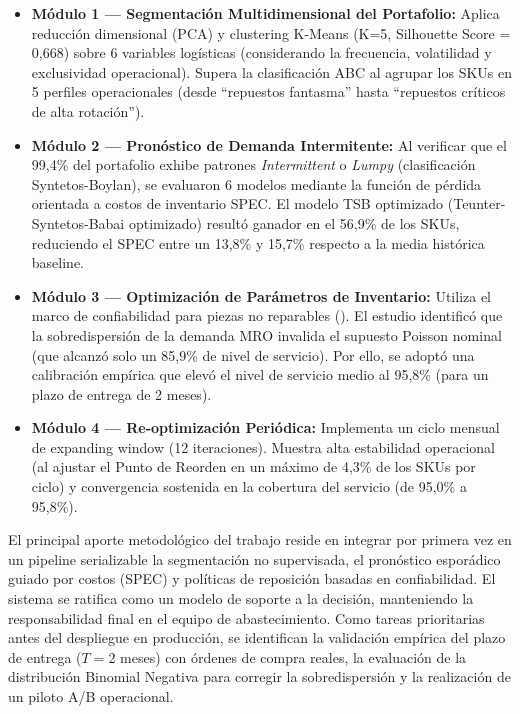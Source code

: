 \documentclass[10pt,a4paper]{article}
\begin{document}
\begin{itemize}
    \item \textbf{Módulo 1 — Segmentación Multidimensional del Portafolio:} Aplica reducción dimensional (PCA) y clustering K-Means (K=5, Silhouette Score = 0,668) sobre 6 variables logísticas (considerando la frecuencia, volatilidad y exclusividad operacional). Supera la clasificación ABC al agrupar los SKUs en 5 perfiles operacionales (desde ``repuestos fantasma'' hasta ``repuestos críticos de alta rotación'').
    
    \item \textbf{Módulo 2 — Pronóstico de Demanda Intermitente:} Al verificar que el 99,4\% del portafolio exhibe patrones \textit{Intermittent} o \textit{Lumpy} (clasificación Syntetos-Boylan), se evaluaron 6 modelos mediante la función de pérdida orientada a costos de inventario SPEC. El modelo TSB optimizado (Teunter-Syntetos-Babai optimizado) resultó ganador en el 56,9\% de los SKUs, reduciendo el SPEC entre un 13,8\% y 15,7\% respecto a la media histórica baseline. 
    
    \item \textbf{Módulo 3 — Optimización de Parámetros de Inventario:} Utiliza el marco de confiabilidad para piezas no reparables (\cite{louit2011}). El estudio identificó que la sobredispersión de la demanda MRO invalida el supuesto Poisson nominal (que alcanzó solo un 85,9\% de nivel de servicio). Por ello, se adoptó una calibración empírica que elevó el nivel de servicio medio al 95,8\% (para un plazo de entrega de 2 meses). 
    
    \item \textbf{Módulo 4 — Re-optimización Periódica:} Implementa un ciclo mensual de expanding window (12 iteraciones). Muestra alta estabilidad operacional (al ajustar el Punto de Reorden en un máximo de 4,3\% de los SKUs por ciclo) y convergencia sostenida en la cobertura del servicio (de 95,0\% a 95,8\%). 
\end{itemize}

El principal aporte metodológico del trabajo reside en integrar por primera vez en un pipeline serializable la segmentación no supervisada, el pronóstico esporádico guiado por costos (SPEC) y políticas de reposición basadas en confiabilidad. El sistema se ratifica como un modelo de soporte a la decisión, manteniendo la responsabilidad final en el equipo de abastecimiento. Como tareas prioritarias antes del despliegue en producción, se identifican la validación empírica del plazo de entrega ($T=2$ meses) con órdenes de compra reales, la evaluación de la distribución Binomial Negativa para corregir la sobredispersión y la realización de un piloto A/B operacional.
\newpage
\end{document}
